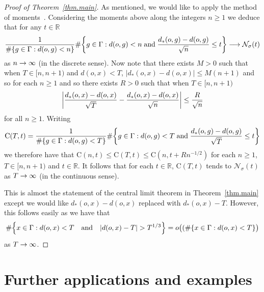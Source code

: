 \documentclass[10pt]{amsart}
\theoremstyle{definition}\newtheorem{defi}[theo]{Definition}\newtheorem{rema}[theo]{Remark}\newtheorem{exam}[theo]{Example}\newtheorem{exem}[theo]{Example}\newtheorem{nota}[theo]{Notation}
\newcommand{\G}{\Gamma}
\newcommand{\Nc}{\mathcal{N}}
\newcommand{\R}{\mathbb{R}}
\newcommand*\rmC{\mathrm{C}}
\let\originalleft\left
\let\originalright\right
\renewcommand{\left}{\mathopen{}\mathclose\bgroup\originalleft}
\renewcommand{\right}{\aftergroup\egroup\originalright}
\renewcommand*{\to}{\mathchoice{\longrightarrow}{\rightarrow}{\rightarrow}{\rightarrow}}
\theoremstyle{plain}
\begin{document}
\begin{proof}[Proof of Theorem~\ref{thm.main}]
As mentioned, we would like to apply the method of moments~\cite[Theorem~30.2]{billingsley}. Considering the moments above along the integers $n\ge 1$ we deduce that for any $t\in\R$
\begin{align*}
\frac{1}{\#\left\{ g \in \G: d(o,g) < n\right\}}
 \#\left\{ g \in \G: d(o,g) < n\;\text{and}\; \frac{d_\ast(o,g) - d(o,g)}{\sqrt{n}} \le t \right\} \to \Nc_\sigma(t)
\end{align*}
as $n\to\infty$ (in the discrete sense). Now note that there exists $M>0$ such that when $T \in [n, n+1)$ and $d(o,x) < T$, $|d_\ast(o,x) - d(o,x)| \le M(n + 1)$ and so for each $n \ge 1$ and so there exists $R >0$ such that when $T \in [n,n+1)$
\[
\left| \frac{d_\ast(o,x) - d(o,x)}{\sqrt{T}} - \frac{d_\ast(o,x) - d(o,x)}{\sqrt{n}}\right| \le \frac{R}{\sqrt{n}}
\]
for all $n\ge 1$. Writing
\begin{align*}
\rmC(T,t) = \frac{1}{\#\{ g \in \G: d(o,g) < T\}}
\#\left\{ g \in \G: d(o,g) < T \;\text{and}\; \frac{d_\ast(o,g) - d(o,g)}{\sqrt{T}} \le t \right\}
\end{align*}
we therefore have that $\rmC(n,t) \le \rmC(T,t) \le \rmC(n, t + Rn^{-1/2})$ for each $n\ge 1$, $T \in [n,n+1)$ and $t \in \R$. It follows that for each $t \in \R$, $\rmC(T,t)$ tends to $\Nc_\sigma(t)$ as $T\to\infty$ (in the continuous sense).

This is almost the statement of the central limit theorem in Theorem~\ref{thm.main} except we would like $d_\ast(o,x) - d(o,x)$ replaced with $d_\ast(o,x) - T$. However, this follows easily as we have that
\[
\#\left\{ x\in \G: d(o,x) < T \quad\text{and}\quad |d(o,x) - T| > T^{1/3}\right\} = o\bigl((\#\{ x \in \G: d(o,x) < T\}\bigr)
\]
as $T\to\infty$.
\end{proof}
\section{Further applications and examples}\label{sect4}
\end{document}
